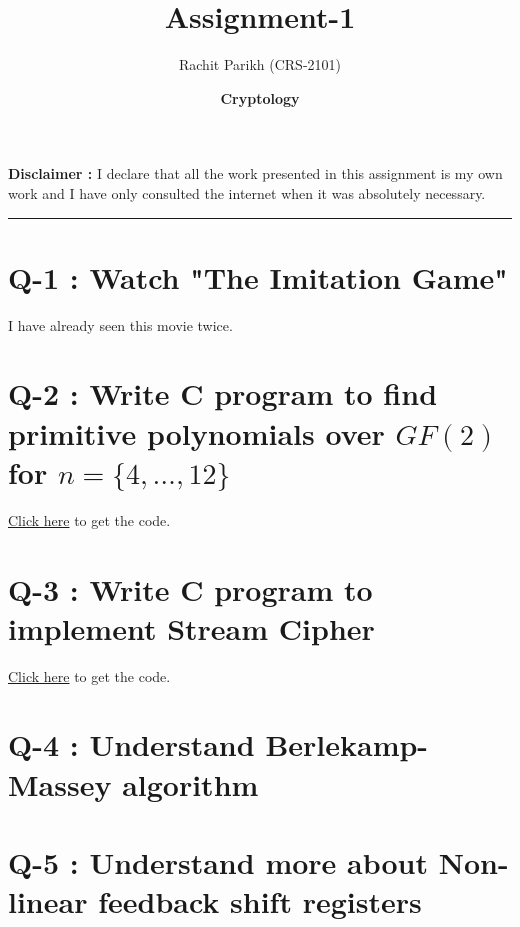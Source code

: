 \documentclass[14pt]{article}
\begin{document}
	
	\title{\color{blue}\Huge \textbf{Assignment-1}} 
	\date{\Large \textbf{Cryptology}}
	\author{Rachit Parikh (CRS-2101)}
	
	\maketitle
	\textbf{Disclaimer : }I declare that all the work presented in this assignment is my own work and I have only consulted the internet when it was absolutely necessary. 
	
	\noindent
	\rule{\linewidth}{0.4pt}
	
	\section*{Q-1 : Watch "The Imitation Game"}
		\noindent
		I have already seen this movie twice.\\
		
	\section*{Q-2 : Write C program to find primitive polynomials over $GF(2)$ for $n = \{4, \dots ,12\}$}
		\noindent
		\href{https://www.youtube.com/watch?v=ao4RCon11eY}{Click here} to get the code.\\
	\section*{Q-3 : Write C program to implement Stream Cipher}
		\noindent
		\href{https://www.youtube.com/watch?v=aUnTuRnML5Y}{Click here} to get the code.\\
	\section*{Q-4 : Understand Berlekamp-Massey algorithm}
		\noindent
	\section*{Q-5 : Understand more about Non-linear feedback shift registers}
		\noindent
		
	
\end{document}

